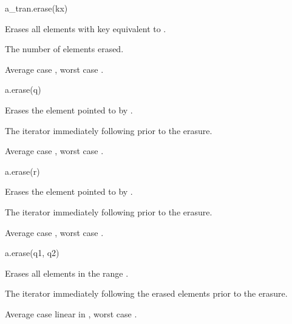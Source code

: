 %
\begin{itemdecl}
a_tran.erase(kx)
\end{itemdecl}

\begin{itemdescr}
\pnum
\result
{}

\pnum
\effects
Erases all elements with key equivalent to .

\pnum
\returns
The number of elements erased.

\pnum
\complexity
Average case ,
worst case .
\end{itemdescr}

%
\begin{itemdecl}
a.erase(q)
\end{itemdecl}

\begin{itemdescr}
\pnum
\result
{}

\pnum
\effects
Erases the element pointed to by .

\pnum
\returns
The iterator immediately following  prior to the erasure.

\pnum
\complexity
Average case , worst case .
\end{itemdescr}

%
\begin{itemdecl}
a.erase(r)
\end{itemdecl}

\begin{itemdescr}
\pnum
\result
{}

\pnum
\effects
Erases the element pointed to by .

\pnum
\returns
The iterator immediately following  prior to the erasure.

\pnum
\complexity
Average case , worst case .
\end{itemdescr}

%
\begin{itemdecl}
a.erase(q1, q2)
\end{itemdecl}

\begin{itemdescr}
\pnum
\result
{}

\pnum
\effects
Erases all elements in the range .

\pnum
\returns
The iterator immediately following the erased elements prior to the erasure.

\pnum
\complexity
Average case linear in ,
worst case .
\end{itemdescr}


